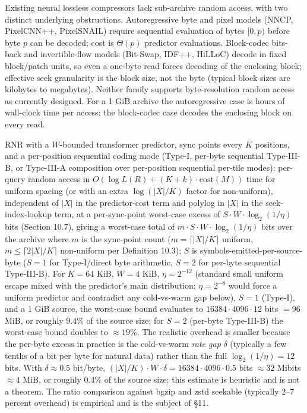 \documentclass[
]{article}
\begin{document}
Existing neural lossless compressors lack sub-archive random access,
with two distinct underlying obstructions. Autoregressive byte and
pixel models (NNCP, PixelCNN++, PixelSNAIL) require sequential
evaluation of bytes $[0, p)$ before byte $p$ can be decoded; cost is
$\Theta(p)$ predictor evaluations. Block-codec bits-back and
invertible-flow models (Bit-Swap, IDF++, HiLLoC) decode in fixed
block/patch units, so even a one-byte read forces decoding of the
enclosing block; effective seek granularity is the block size, not
the byte (typical block sizes are kilobytes to megabytes). Neither
family supports byte-resolution random access as currently designed.
For a 1 GiB archive the autoregressive case is hours of wall-clock
time per access; the block-codec case decodes the enclosing block
on every read.

RNR with a $W$-bounded transformer predictor, sync points every
$K$ positions, and a per-position sequential coding mode (Type-I,
per-byte sequential Type-III-B, or Type-III-A composition over
per-position sequential per-tile modes): per-query random access
in $O(\log L(R) + (K + k) \cdot \mathrm{cost}(M))$ time for uniform
spacing (or with an extra $\log(|X|/K)$ factor for non-uniform),
independent of $|X|$ in the predictor-cost term and polylog in
$|X|$ in the seek-index-lookup term, at a per-sync-point
worst-case excess of $S \cdot W \cdot \log_2(1/\eta)$ bits
(Section 10.7), giving a worst-case total of $m \cdot S \cdot W
\cdot \log_2(1/\eta)$ bits over the archive where $m$ is the
sync-point count ($m = \lceil |X|/K \rceil$ uniform, $m \leq \lceil
2|X|/K \rceil$ non-uniform per Definition 10.3); $S$ is
symbols-emitted-per-source-byte ($S = 1$ for Type-I/direct byte
arithmetic, $S = 2$ for per-byte sequential Type-III-B). For
$K = 64$ KiB, $W = 4$ KiB, $\eta = 2^{-12}$ (standard small
uniform escape mixed with the predictor's main distribution;
$\eta = 2^{-8}$ would force a uniform predictor and contradict
any cold-vs-warm gap below), $S = 1$ (Type-I), and a 1 GiB source,
the worst-case bound evaluates to $16384 \cdot 4096 \cdot 12$
bits $= 96$ MiB, or roughly $9.4\%$ of the source size; for $S = 2$
(per-byte Type-III-B) the worst-case bound doubles to $\approx
19\%$. The realistic overhead is smaller because the
per-byte excess in practice is the cold-vs-warm \emph{rate gap}
$\delta$ (typically a few tenths of a bit per byte for natural
data) rather than the full $\log_2(1/\eta) = 12$ bits. With
$\delta \approx 0.5$ bit/byte, $(|X|/K) \cdot W \cdot \delta =
16384 \cdot 4096 \cdot 0.5$ bits $\approx 32$ Mibits $\approx 4$
MiB, or roughly $0.4\%$ of the source size; this estimate is
heuristic and is not a theorem. The ratio comparison
against bgzip and zstd seekable (typically 2--7 percent overhead)
is empirical and is the subject of §11.
\end{document}
